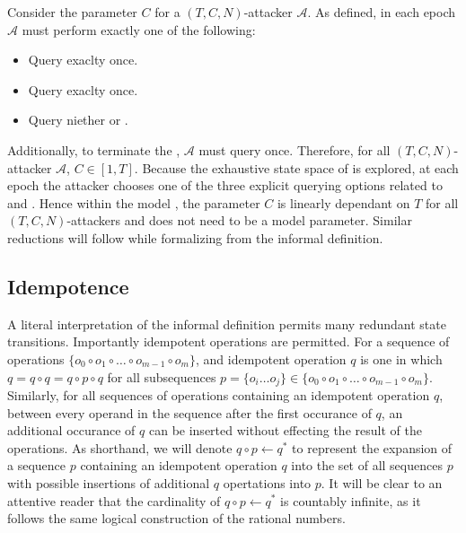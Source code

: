 Consider the parameter \(C\) for a \((T, C, N)\)-attacker \(\mathcal{A}\).
As defined, in each epoch \(\mathcal{A}\) must perform exactly one of the following:

\begin{itemize}
  \item Query  exaclty once.
  \item Query   exaclty once.
  \item Query niether  or .
\end{itemize}

Additionally, to terminate the \CGKAsec, \(\mathcal{A}\) must query  once.
Therefore, for all \((T, C, N)\)-attacker \(\mathcal{A}\), \(C \in [1, T]\).
Because the exhaustive state space of is explored, at each epoch the attacker chooses one of the three explicit querying options related to  and .
Hence within the model , the parameter \(C\) is linearly dependant on \(T\) for all \((T, C, N)\)-attackers and does not need to be a model parameter.
Similar reductions will follow while formalizing  from the informal \CGKAsec definition.

\hypertarget{idempotence}{%
\subsection{Idempotence}\label{idempotence}}

A literal interpretation of the informal \CGKAsec definition permits many redundant state transitions.
Importantly idempotent operations are permitted.
For a sequence of operations \( \{ o_0 \circ o_{1} \circ \ldots \circ o_{m-1} \circ o_{m} \} \), and idempotent operation \(q\) is one in which \(q = q \circ q = q \circ p \circ q\) for all subsequences \(p = \{o_i \ldots o_j \} \in \{ o_0 \circ o_{1} \circ \ldots \circ o_{m-1} \circ o_{m} \} \).
Similarly, for all sequences of operations containing an idempotent operation \(q\), between every operand in the sequence after the first occurance of \(q\), an additional occurance of \(q\) can be inserted without effecting the result of the operations.
As shorthand, we will denote \(q \circ p \gets q^{*}\) to represent the expansion of a sequence \(p\) containing an idempotent operation \(q\) into the set of all sequences \(p\) with possible insertions of additional \(q\) opertations into \(p\).
It will be clear to an attentive reader that the cardinality of \(q \circ p \gets q^{*}\) is countably infinite, as it follows the same logical construction of the rational numbers.

